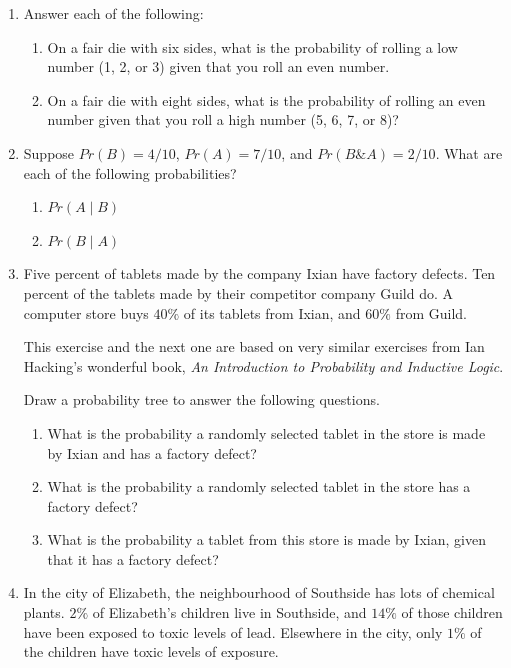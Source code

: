 \documentclass[justified]{tufte-book}
\providecommand{\tightlist}{%
  \setlength{\itemsep}{0pt}\setlength{\parskip}{0pt}}
\newcommand{\given}{\mid}
\renewcommand{\wedge}{\mathbin{\&}}
\newcommand{\p}{Pr}
\theoremstyle{definition}
\theoremstyle{definition}
\theoremstyle{definition}
\theoremstyle{remark}
\begin{document}
\begin{enumerate}
\item
  Answer each of the following:

  \begin{enumerate}
  \def\labelenumii{\alph{enumii}.}
  \tightlist
  \item
    On a fair die with six sides, what is the probability of rolling a
    low number (1, 2, or 3) given that you roll an even number.
  \item
    On a fair die with eight sides, what is the probability of rolling
    an even number given that you roll a high number (5, 6, 7, or 8)?
  \end{enumerate}
\item
  Suppose \(\p(B) = 4/10\), \(\p(A) = 7/10\), and
  \(\p(B \wedge A) = 2/10\). What are each of the following
  probabilities?

  \begin{enumerate}
  \def\labelenumii{\alph{enumii}.}
  \tightlist
  \item
    \(\p(A \given B)\)
  \item
    \(\p(B \given A)\)
  \end{enumerate}
\item
  Five percent of tablets made by the company Ixian have factory
  defects. Ten percent of the tablets made by their competitor company
  Guild do. A computer store buys \(40\%\) of its tablets from Ixian,
  and \(60\%\) from Guild.

  \begin{marginfigure}
   This exercise and the next one are based on very similar exercises from
   Ian Hacking's wonderful book, \emph{An Introduction to Probability and
   Inductive Logic}.
   \end{marginfigure}

  Draw a probability tree to answer the following questions.

  \begin{enumerate}
  \def\labelenumii{\alph{enumii}.}
  \tightlist
  \item
    What is the probability a randomly selected tablet in the store is
    made by Ixian and has a factory defect?
  \item
    What is the probability a randomly selected tablet in the store has
    a factory defect?
  \item
    What is the probability a tablet from this store is made by Ixian,
    given that it has a factory defect?
  \end{enumerate}
\item
  In the city of Elizabeth, the neighbourhood of Southside has lots of
  chemical plants. \(2\%\) of Elizabeth's children live in Southside,
  and \(14\%\) of those children have been exposed to toxic levels of
  lead. Elsewhere in the city, only \(1\%\) of the children have toxic
  levels of exposure.


\end{enumerate}
\end{document}
